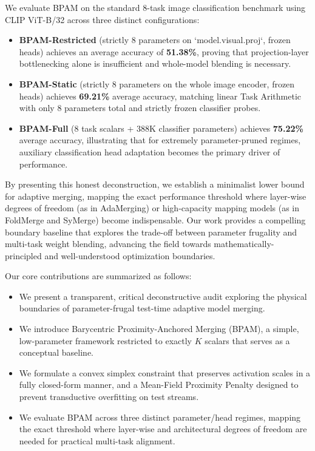 We evaluate BPAM on the standard 8-task image classification benchmark using CLIP ViT-B/32 across three distinct configurations:
\begin{itemize}
    \item {\bf BPAM-Restricted} (strictly 8 parameters on `model.visual.proj`, frozen heads) achieves an average accuracy of {\bf 51.38\%}, proving that projection-layer bottlenecking alone is insufficient and whole-model blending is necessary.
    \item {\bf BPAM-Static} (strictly 8 parameters on the whole image encoder, frozen heads) achieves {\bf 69.21\%} average accuracy, matching linear Task Arithmetic with only 8 parameters total and strictly frozen classifier probes.
    \item {\bf BPAM-Full} (8 task scalars + 388K classifier parameters) achieves {\bf 75.22\%} average accuracy, illustrating that for extremely parameter-pruned regimes, auxiliary classification head adaptation becomes the primary driver of performance.
\end{itemize}

By presenting this honest deconstruction, we establish a minimalist lower bound for adaptive merging, mapping the exact performance threshold where layer-wise degrees of freedom (as in AdaMerging) or high-capacity mapping models (as in FoldMerge and SyMerge) become indispensable. Our work provides a compelling boundary baseline that explores the trade-off between parameter frugality and multi-task weight blending, advancing the field towards mathematically-principled and well-understood optimization boundaries.

Our core contributions are summarized as follows:
\begin{itemize}
    \item We present a transparent, critical deconstructive audit exploring the physical boundaries of parameter-frugal test-time adaptive model merging.
    \item We introduce Barycentric Proximity-Anchored Merging (BPAM), a simple, low-parameter framework restricted to exactly $K$ scalars that serves as a conceptual baseline.
    \item We formulate a convex simplex constraint that preserves activation scales in a fully closed-form manner, and a Mean-Field Proximity Penalty designed to prevent transductive overfitting on test streams.
    \item We evaluate BPAM across three distinct parameter/head regimes, mapping the exact threshold where layer-wise and architectural degrees of freedom are needed for practical multi-task alignment.
\end{itemize}
